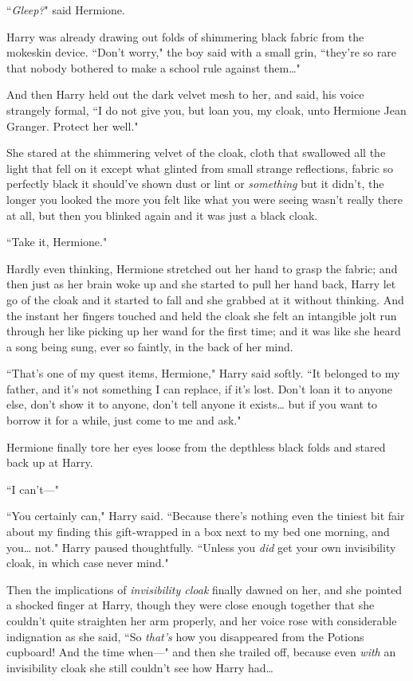 ``\emph{Gleep?}" said Hermione.

Harry was already drawing out folds of shimmering black fabric from the mokeskin device. ``Don't worry," the boy said with a small grin, ``they're so rare that nobody bothered to make a school rule against them{\ldots}"

And then Harry held out the dark velvet mesh to her, and said, his voice strangely formal, ``I do not give you, but loan you, my cloak, unto Hermione Jean Granger. Protect her well."

She stared at the shimmering velvet of the cloak, cloth that swallowed all the light that fell on it except what glinted from small strange reflections, fabric so perfectly black it should've shown dust or lint or \emph{something} but it didn't, the longer you looked the more you felt like what you were seeing wasn't really there at all, but then you blinked again and it was just a black cloak.

``Take it, Hermione."

Hardly even thinking, Hermione stretched out her hand to grasp the fabric; and then just as her brain woke up and she started to pull her hand back, Harry let go of the cloak and it started to fall and she grabbed at it without thinking. And the instant her fingers touched and held the cloak she felt an intangible jolt run through her like picking up her wand for the first time; and it was like she heard a song being sung, ever so faintly, in the back of her mind.

``That's one of my quest items, Hermione," Harry said softly. ``It belonged to my father, and it's not something I can replace, if it's lost. Don't loan it to anyone else, don't show it to anyone, don't tell anyone it exists{\ldots} but if you want to borrow it for a while, just come to me and ask."

Hermione finally tore her eyes loose from the depthless black folds and stared back up at Harry.

``I can't—"

``You certainly can," Harry said. ``Because there's nothing even the tiniest bit fair about my finding this gift-wrapped in a box next to my bed one morning, and you{\ldots} not." Harry paused thoughtfully. ``Unless you \emph{did} get your own invisibility cloak, in which case never mind."

Then the implications of \emph{invisibility cloak} finally dawned on her, and she pointed a shocked finger at Harry, though they were close enough together that she couldn't quite straighten her arm properly, and her voice rose with considerable indignation as she said, ``So \emph{that's} how you disappeared from the Potions cupboard! And the time when—" and then she trailed off, because even \emph{with} an invisibility cloak she still couldn't see how Harry had{\ldots}

